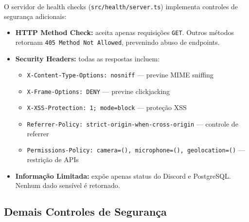 \documentclass[11pt,a4paper]{article}
\begin{document}
O servidor de health checks (\texttt{src/health/server.ts}) implementa controles de segurança adicionais:

\begin{itemize}[leftmargin=1.5em, itemsep=0.3em]
  \item \textbf{HTTP Method Check:} aceita apenas requisições \texttt{GET}. Outros métodos retornam \texttt{405 Method Not Allowed}, prevenindo abuso de endpoints.
  \item \textbf{Security Headers:} todas as respostas incluem:
  \begin{itemize}
    \item \texttt{X-Content-Type-Options: nosniff} — previne MIME sniffing
    \item \texttt{X-Frame-Options: DENY} — previne clickjacking
    \item \texttt{X-XSS-Protection: 1; mode=block} — proteção XSS
    \item \texttt{Referrer-Policy: strict-origin-when-cross-origin} — controle de referrer
    \item \texttt{Permissions-Policy: camera=(), microphone=(), geolocation=()} — restrição de APIs
  \end{itemize}
  \item \textbf{Informação Limitada:} expõe apenas status do Discord e PostgreSQL. Nenhum dado sensível é retornado.
\end{itemize}

\subsection{Demais Controles de Segurança}
\end{document}

